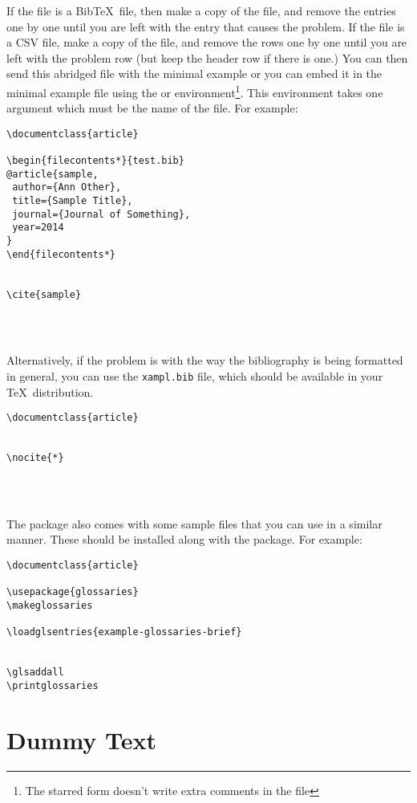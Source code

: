 If the file is a Bib\TeX\ file, then make a copy of the file, and
remove the entries one by one until you are left with the entry that
causes the problem. If the file is a CSV file, make a copy of the
file, and remove the rows one by one until you are left with the
problem row (but keep the header row if there is one.) You can then
send this abridged file with the minimal example or you can embed it
in the minimal example file using the  or
 environment\footnote{The starred form doesn't
write extra comments in the file}. This environment takes one
argument which must be the name of the file. For example:
\begin{verbatim}
\documentclass{article}

\begin{filecontents*}{test.bib}
@article{sample,
 author={Ann Other},
 title={Sample Title},
 journal={Journal of Something},
 year=2014
}
\end{filecontents*}


\cite{sample}




\end{verbatim}

Alternatively, if the problem is with the way the bibliography is
being formatted in general, you can use the \texttt{xampl.bib} file,
which should be available in your \TeX\ distribution.
\begin{verbatim}
\documentclass{article}


\nocite{*}




\end{verbatim}

The  package also comes with some sample files that
you can use in a similar manner. These should be installed along
with the  package. For example:
\begin{verbatim}
\documentclass{article}

\usepackage{glossaries}
\makeglossaries

\loadglsentries{example-glossaries-brief}


\glsaddall
\printglossaries

\end{verbatim}

\section{Dummy Text}
\label{sec:dummytext}

